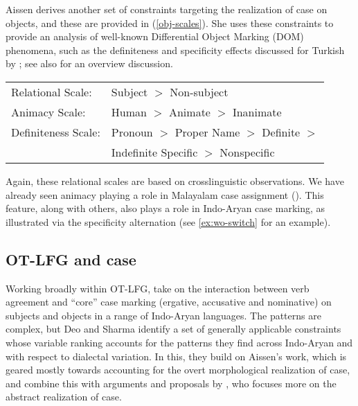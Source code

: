 \documentclass[output=paper,hidelinks]{langscibook}
\begin{document}
Aissen derives another set of constraints targeting the realization of case on
objects, and these are provided in (\ref{obj-scales}).  She uses these  constraints
to provide an analysis of well-known Differential Object Marking (DOM)
phenomena, such as the definiteness and specificity
effects discussed for 
Turkish by \citet{enc1991}; see also \citet{Butt2006} for an overview discussion. 

  \ea \label{obj-scales}
\begin{tabular}[t]{ll}
Relational Scale: & Subject $>$ Non-subject  \\
Animacy Scale: & Human  $>$ Animate $>$ Inanimate \\
Definiteness Scale: & Pronoun $>$ Proper Name $>$ Definite $>$ \\
& Indefinite Specific $>$ Nonspecific \\
\end{tabular}
\z
Again, these relational scales are based on crosslinguistic observations.  We
have already seen  animacy playing a role in Malayalam case assignment ().  This feature, along with others, also plays a role in
Indo-Aryan case marking, as illustrated via the specificity alternation (see
\ref{ex:wo-switch} for an example).




 \subsection{OT-LFG and case}
      
Working broadly within OT-LFG, \citet{deo-sharma06} take on the interaction
between verb agreement and ``core'' case marking (ergative, accusative and
nominative) on subjects and objects
 in a range of Indo-Aryan languages. The
patterns are complex, but Deo and Sharma identify a set of generally applicable
constraints whose variable ranking accounts for the  patterns they find
across Indo-Aryan and with respect to dialectal variation.  In this, they build
on Aissen's work, which is geared mostly towards accounting for the overt
morphological realization of case, and combine this with arguments and proposals
by \citet{Woolford2001}, who focuses more on the abstract realization of case. 
\end{document}
